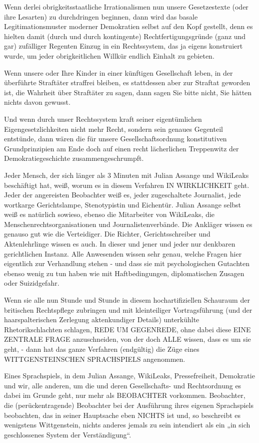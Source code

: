 \begin{multicols}{2}
Wenn derlei obrigkeitsstaatliche Irrationalismen nun
unsere Gesetzestexte (oder ihre Lesarten) zu durchdringen beginnen, dann wird das basale Legitimationsmuster moderner Demokratien selbst auf den Kopf gestellt,
denn es hielten damit (durch und durch kontingente)
Rechtfertigungsgründe (ganz und gar) zufälliger Regenten Einzug in ein Rechtssystem, das ja eigens konstruiert
wurde, um jeder obrigkeitlichen Willkür endlich Einhalt
zu gebieten.

Wenn unsere oder Ihre Kinder in einer künftigen Gesellschaft leben, in der überführte Straftäter straffrei bleiben, es stattdessen aber zur Straftat geworden ist, die
Wahrheit über Straftäter zu sagen, dann sagen Sie bitte
nicht, Sie hätten nichts davon gewusst.

Und wenn durch unser Rechtssystem kraft seiner eigentümlichen Eigengesetzlichkeiten nicht mehr Recht, sondern sein genaues Gegenteil entstünde, dann wären die
für unsere Gesellschaftsordnung konstitutiven Grundprinzipien am Ende doch auf einen recht lächerlichen
Treppenwitz der Demokratiegeschichte zusammengeschrumpft.

Jeder Mensch, der sich länger als 3 Minuten mit Julian
Assange und WikiLeaks beschäftigt hat, weiß, worum es
in diesem Verfahren IN WIRKLICHKEIT geht. Jeder der
angereisten Beobachter weiß es, jeder zugeschaltete
Journalist, jede wortkarge Gerichtslampe, Stenotypistin
und Eichentür. Julian Assange selbst weiß es natürlich
sowieso, ebenso die Mitarbeiter von WikiLeaks, die Menschenrechtsorganisationen und Journalistenverbände.
Die Ankläger wissen es genauso gut wie die Verteidiger.
Die Richter, Gerichtsschreiber und Aktenlehrlinge wissen es auch. In dieser und jener und jeder nur denkbaren gerichtlichen Instanz. Alle Anwesenden wissen sehr
genau, welche Fragen hier eigentlich zur Verhandlung
stehen - und dass sie mit psychologischen Gutachten
ebenso wenig zu tun haben wie mit Haftbedingungen,
diplomatischen Zusagen oder Suizidgefahr.

Wenn sie alle nun Stunde und Stunde in diesem hochartifiziellen Schauraum der britischen Rechtspflege zubringen und mit kleinteiliger Vortragsführung (und der
haarspalterischen Zerlegung aktenkundiger Details)
unterkühlte Rhetorikschlachten schlagen, REDE UM
GEGENREDE, ohne dabei diese EINE ZENTRALE FRAGE anzuschneiden, von der doch ALLE wissen, dass es
um sie geht, - dann hat das ganze Verfahren (endgültig)
die Züge eines WITTGENSTEINSCHEN SPRACHSPIELS
angenommen.

Eines Sprachspiels, in dem Julian Assange, WikiLeaks,
Pressefreiheit, Demokratie und wir, alle anderen, um die
und deren Gesellschafts- und Rechtsordnung es dabei
im Grunde geht, nur mehr als BEOBACHTER vorkommen. Beobachter, die (perückentragende) Beobachter
bei der Ausführung ihres eigenen Sprachspiels beobachten, das in seiner Hauptsache eben NICHTS ist und, so
beschreibt es wenigstens Wittgenstein, nichts anderes
jemals zu sein intendiert als ein „in sich geschlossenes
System der Verständigung“.



\end{multicols}

